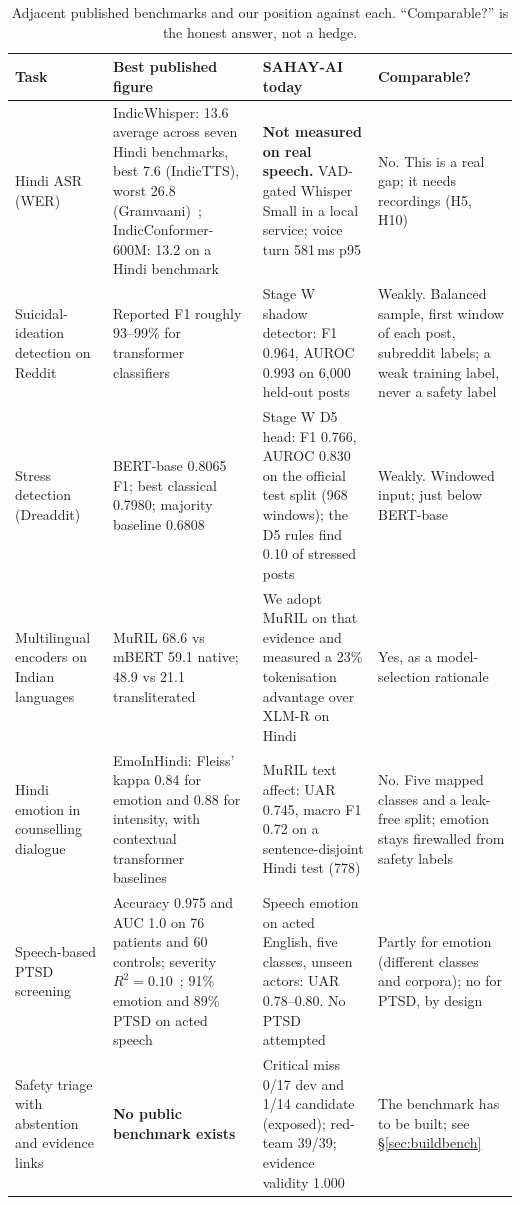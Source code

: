 \documentclass[11pt,a4paper]{article}
\begin{document}
\begin{table}[!htbp]
\centering\footnotesize
\caption{Adjacent published benchmarks and our position against each. ``Comparable?'' is the honest
answer, not a hedge.}
\label{tab:benchtable}
\begin{tabularx}{\linewidth}{@{}>{\raggedright\arraybackslash}p{3.1cm}>{\raggedright\arraybackslash}p{4.3cm}>{\raggedright\arraybackslash}p{3.5cm}X@{}}
\toprule
Task & Best published figure & SAHAY-AI today & Comparable? \\
\midrule
Hindi ASR (WER) & IndicWhisper: 13.6 average across seven Hindi benchmarks, best 7.6 (IndicTTS),
worst 26.8 (Gramvaani)~\cite{vistaar}; IndicConformer-600M: 13.2 on a Hindi
benchmark~\cite{indicconformer} & \textbf{Not measured on real speech.} VAD-gated Whisper Small in
a local service; voice turn 581\,ms p95 & No. This is a real gap; it needs recordings (H5, H10) \\
Suicidal-ideation detection on Reddit & Reported F1 roughly 93--99\% for transformer
classifiers~\cite{suicidereview,suiciderobertas} & Stage W shadow detector: F1 0.964, AUROC 0.993 on
6{,}000 held-out posts & Weakly. Balanced sample, first window of each post, subreddit labels; a weak
training label, never a safety label \\
Stress detection (Dreaddit) & BERT-base 0.8065 F1; best classical 0.7980; majority baseline
0.6808~\cite{dreaddit} & Stage W D5 head: F1 0.766, AUROC 0.830 on the official test split (968
windows); the D5 rules find 0.10 of stressed posts & Weakly. Windowed input; just below BERT-base \\
Multilingual encoders on Indian languages & MuRIL 68.6 vs mBERT 59.1 native; 48.9 vs 21.1
transliterated~\cite{khanuja2021} & We adopt MuRIL on that evidence and measured a 23\% tokenisation
advantage over XLM-R on Hindi & Yes, as a model-selection rationale \\
Hindi emotion in counselling dialogue & EmoInHindi: Fleiss' kappa 0.84 for emotion and 0.88 for
intensity, with contextual transformer baselines~\cite{singh2022} & MuRIL text affect: UAR 0.745,
macro F1 0.72 on a sentence-disjoint Hindi test (778) & No. Five mapped classes and a leak-free split;
emotion stays firewalled from safety labels \\
Speech-based PTSD screening & Accuracy 0.975 and AUC 1.0 on 76 patients and 60 controls; severity
$R^2 = 0.10$~\cite{hu2024}; 91\% emotion and 89\% PTSD on acted speech~\cite{islam2024} & Speech
emotion on acted English, five classes, unseen actors: UAR 0.78--0.80. No PTSD attempted & Partly for
emotion (different classes and corpora); no for PTSD, by design \\
Safety triage with abstention and evidence links & \textbf{No public benchmark exists} & Critical
miss 0/17 dev and 1/14 candidate (exposed); red-team 39/39; evidence validity 1.000 & The benchmark has to be
built; see \S\ref{sec:buildbench} \\
\bottomrule
\end{tabularx}
\end{table}
\end{document}
